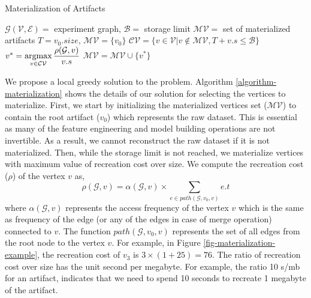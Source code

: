 \begin{algorithm}
\caption{Materialization of Artifacts}\label{algorithm-materialization}
\begin{algorithmic}[1]
\Require  $\mathcal{G(V,E)}=$ experiment graph, $\mathcal{B}=$ storage limit
\Ensure $\mathcal{MV}=$ set of materialized artifacts
\State $T=v_0.size$, $\mathcal{MV} =\{v_0\}$
\Do 
	\State $\mathcal{CV} = \{v \in \mathcal{V} \lvert v \notin \mathcal{MV}, T + v.s \leq \mathcal{B}\}$
	\State $v^* = \operatorname*{argmax}\limits_{v \in \mathcal{CV}} \dfrac{\rho(\mathcal{G}, v)}{v.s}$
	\State $\mathcal{MV} = \mathcal{MV} \cup \{v^*\}$
\end{algorithmic}
\end{algorithm}

We propose a local greedy solution to the problem.
Algorithm \ref{algorithm-materialization} shows the details of our solution for selecting the vertices to materialize.
First, we start by initializing the materialized vertices set ($\mathcal{MV}$) to contain the root artifact ($v_0$) which represents the raw dataset.
This is essential as many of the feature engineering and model building operations are not invertible.
As a result, we cannot reconstruct the raw dataset if it is not materialized.
Then, while the storage limit is not reached, we materialize vertices with maximum value of recreation cost over size.
We compute the recreation cost ($\rho$) of the vertex $v$ as, 
\[
\rho(\mathcal{G}, v) = \alpha(\mathcal{G}, v) \times \sum\limits_{e \in path(\mathcal{G}, v_0, v)}  e.t
\]
where $\alpha(\mathcal{G}, v)$ represents the access frequency of the vertex $v$ which is the same as frequency of the edge (or any of the edges in case of merge operation) connected to $v$.
The function $path(\mathcal{G}, v_0, v)$ represents the set of all edges from the root node to the vertex $v$. 
For example, in Figure \ref{fig-materialization-example}, the recreation cost of $v_3$ is $3 \times (1 + 25) = 76$.
The ratio of recreation cost over size has the unit second per megabyte.
For example, the ratio 10 s/mb for an artifact, indicates that we need to spend 10 seconds to recreate 1 megabyte of the artifact.

